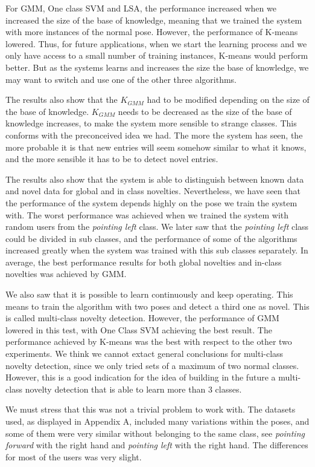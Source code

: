 For GMM, One class SVM and LSA, the performance increased when we increased the size of the base of knowledge, meaning that we trained the system with more instances of the normal pose. However, the performance of K-means lowered. Thus, for future applications, when we start the learning process and we only have access to a small number of training instances, K-means would perform better. But as the systems learns and increases the size the base of knowledge, we may want to switch and use one of the other three algorithms.

The results also show that the $ K_{GMM} $ had to be modified depending on the size of the base of knowledge. $ K_{GMM} $ needs to be decreased as the size of the base of knowledge increases, to make the system more sensible to strange classes. This conforms with the preconceived idea we had. The more the system has seen, the more probable it is that new entries will seem somehow similar to what it knows, and the more sensible it has to be to detect novel entries.

The results also show that the system is able to distinguish between known data and novel data for global and in class novelties. Nevertheless, we have seen that the performance of the system depends highly on the pose we train the system with. The worst performance was achieved when we trained the system with random users from the \emph{pointing left} class. We later saw that the \emph{pointing left} class could be divided in sub classes, and the performance of some of the algorithms increased greatly when the system was trained with this sub classes separately. In average, the best performance results for both global novelties and in-class novelties was achieved by GMM.

We also saw that it is possible to learn continuously and keep operating. This means to train the algorithm with two poses and detect a third one as novel. This is called multi-class novelty detection. However, the performance of GMM lowered in this test, with One Class SVM achieving the best result. The performance achieved by K-means was the best with respect to the other two experiments. We think we cannot extact general conclusions for multi-class novelty detection, since we only tried sets of a maximum of two normal classes. However, this is a good indication for the idea of building in the future a multi-class novelty detection that is able to learn more than 3 classes.

We must stress that this was not a trivial problem to work with. The datasets used, as displayed in Appendix A, included many variations within the poses, and some of them were very similar without belonging to the same class, see \emph{pointing forward} with the right hand and \emph{pointing left} with the right hand. The differences for most of the users was very slight. 

